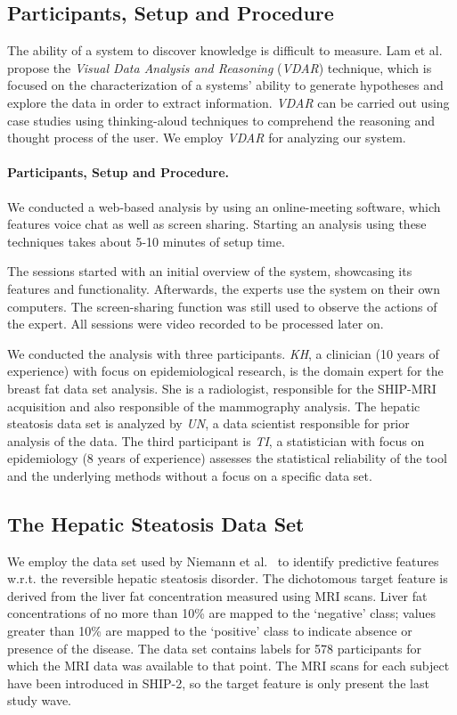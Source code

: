 \documentclass[journal]{style/vgtc} 			          %
\begin{document}
\subsection{Participants, Setup and Procedure}
The ability of a system to discover knowledge is difficult to measure.
Lam et al.~\cite{Lam2012} propose the \emph{Visual Data Analysis and Reasoning} (\emph{VDAR}) technique, which is focused on the characterization of a systems' ability to generate hypotheses and explore the data in order to extract information.
\emph{VDAR} can be carried out using case studies using thinking-aloud techniques to comprehend the reasoning and thought process of the user.
We employ \emph{VDAR} for analyzing our system.
\paragraph{Participants, Setup and Procedure.}
We conducted a web-based analysis by using an online-meeting software, which features voice chat as well as screen sharing.
Starting an analysis using these techniques takes about 5-10 minutes of setup time.

The sessions started with an initial overview of the system, showcasing its features and functionality.
Afterwards, the experts use the system on their own computers.
The screen-sharing function was still used to observe the actions of the expert.
All sessions were video recorded to be processed later on.

We conducted the analysis with three participants.
\emph{KH}, a clinician (10 years of experience) with focus on epidemiological research, is the domain expert for the breast fat data set analysis.
She is a radiologist, responsible for the SHIP-MRI acquisition and also responsible of the mammography analysis.
The hepatic steatosis data set is analyzed by \emph{UN}, a data scientist responsible for prior analysis of the data.
The third participant is \emph{TI}, a statistician with focus on epidemiology (8 years of experience) assesses the statistical reliability of the tool and the underlying methods without a focus on a specific data set.
\subsection{The Hepatic Steatosis Data Set}
We employ the data set used by Niemann et al.~\cite{Niemann2014} to identify predictive features w.r.t. the reversible hepatic steatosis disorder.
The dichotomous target feature is derived from the liver fat concentration measured using MRI scans.
Liver fat concentrations of no more than 10\% are mapped to the `negative' class; values greater than 10\% are mapped to the `positive' class to indicate absence or presence of the disease.
The data set contains labels for 578 participants for which the MRI data was available to that point.
The MRI scans for each subject have been introduced in SHIP-2, so the target feature is only present the last study wave.
\end{document}
